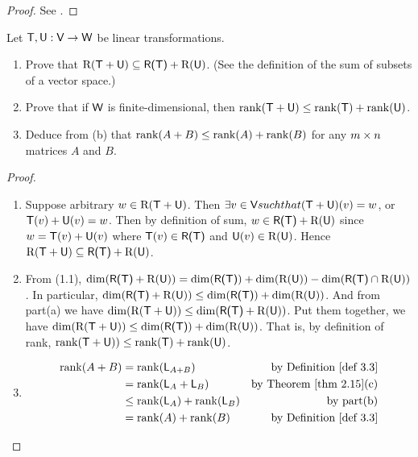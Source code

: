 \begin{proof}
See .
\end{proof}

\begin{exercise} \label{exercise 3.2.14}
Let \(\textsf{T}, \textsf{U}: \textsf{V} \to \textsf{W}\) be linear transformations.
\begin{enumerate}
\item Prove that \(\mathrm{R}(\textsf{T} + \textsf{U}) \subseteq \textsf{R(T)} + \mathrm{R}(\textsf{U})\).
(See the definition  of the sum of subsets of a vector space.)
\item Prove that if \(\textsf{W}\) is finite-dimensional, then \(\mathrm{rank}(\textsf{T} + \textsf{U}) \le \mathrm{rank}(\textsf{T}) + \mathrm{rank}(\textsf{U})\).
\item Deduce from (b) that \(\mathrm{rank}(A + B) \le \mathrm{rank}(A) + \mathrm{rank}(B)\) for any \(m \times n\) matrices \(A\) and \(B\).
\end{enumerate}
\end{exercise}

\begin{proof} \ 

\begin{enumerate}
\item Suppose arbitrary \(w \in \mathrm{R}(\textsf{T} + \textsf{U})\).
Then \(\exists v \in \textsf{V} such that (\textsf{T} + \textsf{U})(v) = w\), or \(\textsf{T}(v) + \textsf{U}(v) = w\).
Then by definition of sum, \(w \in \textsf{R(T)} + \mathrm{R}(\textsf{U})\) since \(w = \textsf{T}(v) + \textsf{U}(v)\) where \(\textsf{T}(v) \in \textsf{R(T)}\) and \(\textsf{U}(v) \in \mathrm{R}(\textsf{U})\).
Hence \(\mathrm{R}(\textsf{T} + \textsf{U}) \subseteq \textsf{R(T)} + \mathrm{R}(\textsf{U})\).

\sloppy
\item From (1.1), \(\dim(\textsf{R(T)} + \mathrm{R}(\textsf{U})) = \dim(\textsf{R(T)}) + \dim(\mathrm{R}(\textsf{U})) - \dim(\textsf{R(T)} \cap \mathrm{R}(\textsf{U}))\).
In particular, \(\dim(\textsf{R(T)} + \mathrm{R}(\textsf{U})) \le \dim(\textsf{R(T)}) + \dim(\mathrm{R}(\textsf{U}))\).
And from part(a) we have \(\dim(\mathrm{R}(\textsf{T} + \textsf{U})) \le \dim(\textsf{R(T)} + \mathrm{R}(\textsf{U}))\).
Put them together, we have \(\dim(\mathrm{R}(\textsf{T} + \textsf{U})) \le \dim(\textsf{R(T)}) + \dim(\mathrm{R}(\textsf{U}))\).
That is, by definition of rank, \(\mathrm{rank}(\textsf{T} + \textsf{U})) \le \mathrm{rank}(\textsf{T}) + \mathrm{rank}(\textsf{U})\).

\item
\begin{align*}
    \rank(A + B) & = \rank(\LMTRAN_{A + B}) & \text{by \DEF{3.3}} \\
                 & = \rank(\LMTRAN_A + \LMTRAN_B) & \text{by \THM{2.15}(c)} \\
                 & \le \rank(\LMTRAN_A) + \rank(\LMTRAN_B) & \text{by part(b)} \\
                 & = \rank(A) + \rank(B) & \text{by \DEF{3.3}}
\end{align*}
\end{enumerate}
\end{proof}


